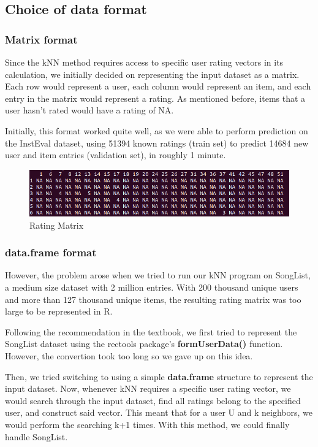 \documentclass{article}
\begin{document}
\subsection{Choice of data format}

\subsubsection{Matrix format}

Since the kNN method requires access to specific user rating vectors in its calculation, we initially decided on representing the input dataset as a matrix. Each row would represent a user, each column would represent an item, and each entry in the matrix would represent a rating. As mentioned before, items that a user hasn't rated would have a rating of NA. 

Initially, this format worked quite well, as we were able to perform prediction on the InstEval dataset, using 51394 known ratings (train set) to predict 14684 new user and item entries (validation set), in roughly 1 minute. 

\begin{figure}[ht]
\centering
\includegraphics[scale=0.5]{Matrix.png}
\caption{Rating Matrix}
\label{fig:universe}
\end{figure}

\subsubsection{data.frame format}

However, the problem arose when we tried to run our kNN program on SongList, a medium size dataset with 2 million entries. With 200 thousand unique users and more than 127 thousand unique items, the resulting rating matrix was too large to be represented in R.

Following the recommendation in the textbook, we first tried to represent the SongList dataset using the rectools package's \textbf{formUserData()} function. However, the convertion took too long so we gave up on this idea.

Then, we tried switching to using a simple \textbf{data.frame} structure to represent the input dataset. Now, whenever kNN requires a specific user rating vector, we would search through the input dataset, find all ratings belong to the specified user, and construct said vector. This meant that for a user U and k neighbors, we would perform the searching k+1 times. With this method, we could finally handle SongList. 
\end{document}
